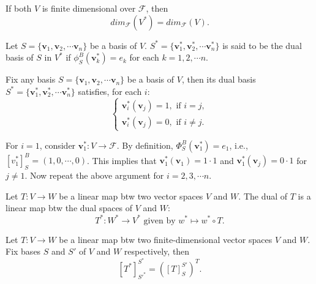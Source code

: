 \begin{corollary}
    If both $V$ is finite dimensional over $\mathcal{F}$, then
    \[dim_\mathcal{F}(V^*)=dim_\mathcal{F}(V).\]
\end{corollary}

\begin{definition}
Let $S=\{\mathbf{v}_1, \mathbf{v}_2,\cdots\mathbf{v}_n\}$ be a basis of $V$.
$S^*=\{\mathbf{v}^*_1, \mathbf{v}^*_2,\cdots\mathbf{v}^*_n\}$ is said to be the dual basis of $S$ in $V^*$ if
\(\phi^{B}_{S}(\mathbf{v}^*_k)=e_k\) for each $k=1,2,\cdots n$.
\end{definition}

\begin{lemma}
    Fix any basis $S=\{\mathbf{v}_1, \mathbf{v}_2,\cdots\mathbf{v}_n\}$ be a basis of $V$, then its dual basis
    $S^*=\{\mathbf{v}^*_1, \mathbf{v}^*_2,\cdots\mathbf{v}^*_n\}$ satisfies, for each $i$:
    \[
    \begin{cases}
        \mathbf{v}^*_i(\mathbf{v}_j) = 1, \text{ if } i=j,\\
        \mathbf{v}^*_i(\mathbf{v}_j) = 0, \text{ if } i\neq j.
    \end{cases}
    \]
\end{lemma}

\begin{pfbox}
    For $i=1$, consider $\mathbf{v}^*_1:V\to\mathcal{F}$.
    By definition, $\Phi^{B}_{S}(\mathbf{v}^*_1)=e_1$, i.e., \([v^*_1]^{B}_{S}=(1,0,\cdots,0)\).
    This implies that $\mathbf{v}^*_1(\mathbf{v}_1)=1\cdot 1$ and $\mathbf{v}^*_1(\mathbf{v}_j)=0\cdot 1$ for $j\ne 1$.
    Now repeat the above argument for $i=2,3,\cdots n$.
\end{pfbox}


\begin{definition}
    Let $T:V\rightarrow W$ be a linear map btw two vector spaces $V$ and $W$.
    The dual of $T$ is a linear map btw the dual spaces of $V$ and $W$:
    \[T^*:W^*\to V^* \text{ given by } w^*\mapsto w^*\circ T.\]
\end{definition}

\begin{theorem}
    Let $T:V\rightarrow W$ be a linear map btw two finite-dimensional vector spaces $V$ and $W$.
    Fix bases $S$ and $S'$ of $V$ and $W$ respectively, then
    \[[T^*]^{S^*}_{S'^*} = ([T]^{S'}_{S})^T.\]
\end{theorem}

